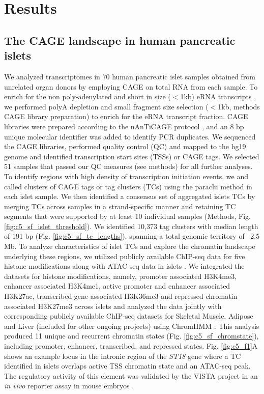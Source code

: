 \section{Results}
\subsection{The CAGE landscape in human pancreatic islets}
We analyzed transcriptomes in 70 human pancreatic islet samples obtained from unrelated organ donors by employing CAGE on total RNA from each sample. To enrich for the non poly-adenylated and short in size ($<$1kb) eRNA transcripts \cite{anderssonAtlasActiveEnhancers2014}, we performed polyA depletion and small fragment size selection ($<$1kb, methods CAGE library preparation) to enrich for the eRNA transcript fraction. CAGE libraries were prepared according to the nAnTiCAGE protocol \cite{murataDetectingExpressedGenes2014}, and an 8 bp unique molecular identifier was added to identify PCR duplicates. We sequenced the CAGE libraries, performed quality control (QC) and mapped to the hg19 genome and identified transcription start sites (TSSs) or CAGE tags. We selected 51 samples that passed our QC measures (see methods) for all further analyses. To identify regions with high density of transcription initiation events, we and called clusters of CAGE tags or tag clusters (TCs) using the paraclu \cite{frithCodeTranscriptionInitiation2008} method in each islet sample. We then identified a consensus set of aggregated islets TCs by merging TCs across samples in a strand-specific manner and retaining TC segments that were supported by at least 10 individual samples (Methods, Fig. \ref{fig:c5_sf_islet_threshold}). We identified 10,373 tag clusters with median length of 191 bp (Fig. \ref{fig:c5_sf_tc_lengths}), spanning a total genomic territory of ~2.5 Mb. To analyze characteristics of islet TCs and explore the chromatin landscape underlying these regions, we utilized publicly available ChIP-seq data for five histone modifications along with ATAC-seq data in islets \cite{varshneyGeneticRegulatorySignatures2017}. We integrated the datasets for histone modifications, namely, promoter associated H3K4me3, enhancer associated H3K4me1, active promoter and enhancer associated H3K27ac, transcribed gene-associated H3K36me3 and repressed chromatin associated H3K27me3 across islets and analyzed the data jointly with corresponding publicly available ChIP-seq datasets for Skeletal Muscle, Adipose and Liver (included for other ongoing projects) using ChromHMM \cite{ernstDiscoveryCharacterizationChromatin2010, ernstMappingAnalysisChromatin2011, ernstChromHMMAutomatingChromatin2012}. This analysis produced 11 unique and recurrent chromatin states (Fig. \ref{fig:c5_sf_chromstate}), including promoter, enhancer, transcribed, and repressed states. Fig. \ref{fig:c5_f1}A shows an example locus in the intronic region of the \textit{ST18} gene where a TC identified in islets overlaps active TSS chromatin state and an ATAC-seq peak. The regulatory activity of this element was validated by the VISTA project in an \textit{in vivo} reporter assay in mouse embryos \cite{viselVISTAEnhancerBrowser2007}. 


